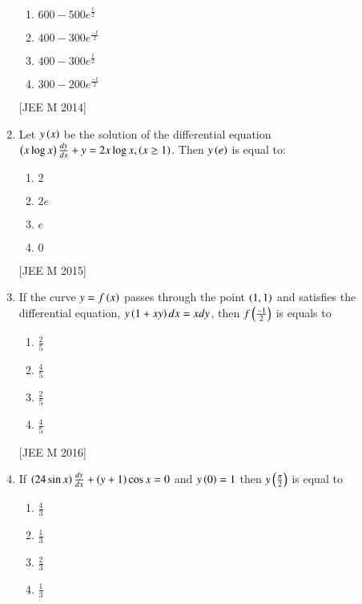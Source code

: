 \documentclass[journal]{IEEEtran}
\begin{document}
\begin{enumerate}
\begin{multicols}{2}
 \begin{enumerate}
    \item $ 600-500e^\frac{t}{2}$
    \item $ 400-300e^\frac{-t}{2}$
    \item $ 400-300e^\frac{t}{2}$
    \item $ 300-200e^\frac{-t}{2}$
 \end{enumerate}
\end{multicols}
\hfill
{[JEE M 2014]}
\item Let $y\left(x\right)$ be the solution of the differential equation $\left(x\log{x}\right)\frac{d{y}}{d{x}} + y = 2x \log{x},\left(x\geq 1\right)$. Then $y\left(e\right)$ is equal to:
\begin{multicols}{2}
 \begin{enumerate}
    \item $ 2 $
    \item $ 2e $
    \item $ e $
    \item $ 0 $
 \end{enumerate}
\end{multicols}
\hfill
{[JEE M 2015]}

\item If the curve $ y=f\left(x\right)$ passes through the point $ \left(1,1\right)$ and satisfies the differential equation, $ y\left(1+xy\right)d{x}=xd{y}$, then $ f\left(\frac{-1}{2}\right)$ is equals to 
\begin{multicols}{2}
 \begin{enumerate}
    \item $ \frac{2}{5}$



    \item $ \frac{4}{5}$


    \item $ \frac{2}{5}$



    \item $ \frac{4}{5}$


  \end{enumerate}
\end{multicols}
\hfill
{[JEE M 2016]}

\item If $ \left(24 \sin{x}\right)\frac{d{y}}{d{x}}+ \left(y+1\right)\cos{x}=0$ and $y\left(0\right)=1$ then $y\left(\frac{\pi}{2}\right)$ is equal to
\begin{multicols}{2}
 \begin{enumerate}
    \item $\frac{4}{3}$
    \item $\frac{1}{3}$
    \item $\frac{2}{3}$
    \item $\frac{1}{3}$
    

\end{enumerate}
\end{multicols}
\end{enumerate}
\end{document}
